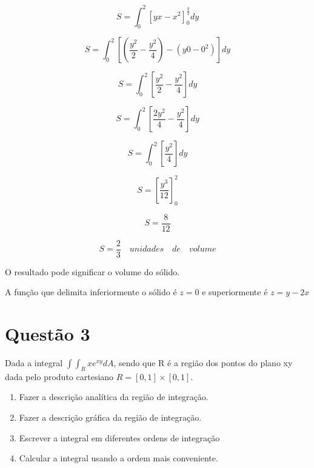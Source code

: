 \documentclass[10pt,a4paper]{article}
\begin{document}
	\begin{equation*}
		S = \int_{0}^{2} \left[ yx-x^2 \right]_0^{\frac{y}{2}} dy
	\end{equation*}

	\begin{equation*}
		S = \int_{0}^{2} \left[ \left(\frac{y^2}{2}-\frac{y^2}{4}\right) - \left(y0-0^2\right) \right] dy
	\end{equation*}	
	
	\begin{equation*}
		S = \int_{0}^{2} \left[\frac{y^2}{2}-\frac{y^2}{4} \right] dy
	\end{equation*}	
	
	\begin{equation*}
		S = \int_{0}^{2} \left[\frac{2y^2}{4}-\frac{y^2}{4} \right] dy
	\end{equation*}
	
	\begin{equation*}
		S = \int_{0}^{2} \left[\frac{y^2}{4}\right] dy
	\end{equation*}	
	
	\begin{equation*}
		S = \left[\frac{y^3}{12} \right]_0^2
	\end{equation*}
	
	\begin{equation*}
		S = \frac{8}{12}
	\end{equation*}
	
	\begin{equation*}
		S = \frac{2}{3} \quad unidades \quad de \quad volume
	\end{equation*}
	
	O resultado pode significar o volume do sólido.
	
	A função que delimita inferiormente o sólido é $ z = 0 $ e superiormente é $ z = y - 2x $
	
	\section*{Questão 3}
	
	Dada a integral $ \int \int_R x e^{xy} dA $, sendo que R é a região dos pontos do plano xy dada pelo produto cartesiano $ R=[0, 1] \times [0, 1] $.
	
	\begin{enumerate}[a]
		\item Fazer a descrição analítica da região de integração.
		\item Fazer a descrição gráfica da região de integração.
		\item Escrever a integral em diferentes ordens de integração
		\item Calcular a integral usando a ordem mais conveniente.
	\end{enumerate}
\end{document}
